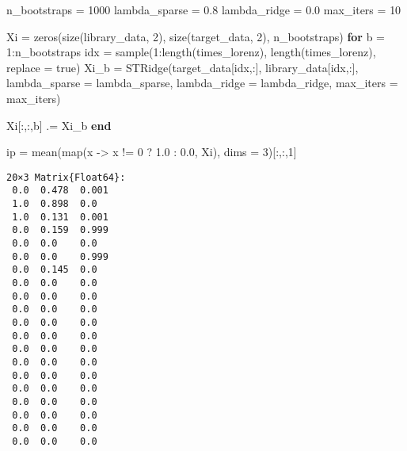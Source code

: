 \documentclass[
]{article}
\newenvironment{Shaded}{\begin{snugshade}}{\end{snugshade}}
\newcommand{\ConstantTok}[1]{\textcolor[rgb]{0.56,0.35,0.01}{#1}}
\newcommand{\ControlFlowTok}[1]{\textcolor[rgb]{0.00,0.23,0.31}{\textbf{#1}}}
\newcommand{\FloatTok}[1]{\textcolor[rgb]{0.68,0.00,0.00}{#1}}
\newcommand{\FunctionTok}[1]{\textcolor[rgb]{0.28,0.35,0.67}{#1}}
\newcommand{\NormalTok}[1]{\textcolor[rgb]{0.00,0.23,0.31}{#1}}
\newcommand{\OperatorTok}[1]{\textcolor[rgb]{0.37,0.37,0.37}{#1}}
\begin{document}
\begin{Shaded}
\begin{Highlighting}[]
\NormalTok{n\_bootstraps }\OperatorTok{=} \FloatTok{1000}
\NormalTok{lambda\_sparse }\OperatorTok{=} \FloatTok{0.8}
\NormalTok{lambda\_ridge }\OperatorTok{=} \FloatTok{0.0}
\NormalTok{max\_iters }\OperatorTok{=} \FloatTok{10}

\NormalTok{Xi }\OperatorTok{=} \FunctionTok{zeros}\NormalTok{(}\FunctionTok{size}\NormalTok{(library\_data, }\FloatTok{2}\NormalTok{), }\FunctionTok{size}\NormalTok{(target\_data, }\FloatTok{2}\NormalTok{), n\_bootstraps)}
\ControlFlowTok{for}\NormalTok{ b }\OperatorTok{=} \FloatTok{1}\OperatorTok{:}\NormalTok{n\_bootstraps}
\NormalTok{    idx }\OperatorTok{=} \FunctionTok{sample}\NormalTok{(}\FloatTok{1}\OperatorTok{:}\FunctionTok{length}\NormalTok{(times\_lorenz), }\FunctionTok{length}\NormalTok{(times\_lorenz), replace }\OperatorTok{=} \ConstantTok{true}\NormalTok{)}
\NormalTok{    Xi\_b }\OperatorTok{=} \FunctionTok{STRidge}\NormalTok{(target\_data[idx,}\OperatorTok{:}\NormalTok{], library\_data[idx,}\OperatorTok{:}\NormalTok{], }
\NormalTok{        lambda\_sparse }\OperatorTok{=}\NormalTok{ lambda\_sparse,}
\NormalTok{        lambda\_ridge }\OperatorTok{=}\NormalTok{ lambda\_ridge,}
\NormalTok{        max\_iters }\OperatorTok{=}\NormalTok{ max\_iters)}

\NormalTok{    Xi[}\OperatorTok{:}\NormalTok{,}\OperatorTok{:}\NormalTok{,b] }\OperatorTok{.=}\NormalTok{ Xi\_b}
\ControlFlowTok{end}

\NormalTok{ip }\OperatorTok{=} \FunctionTok{mean}\NormalTok{(}\FunctionTok{map}\NormalTok{(x }\OperatorTok{{-}\textgreater{}}\NormalTok{ x }\OperatorTok{!=} \FloatTok{0}\NormalTok{ ? }\FloatTok{1.0} \OperatorTok{:} \FloatTok{0.0}\NormalTok{, Xi), dims }\OperatorTok{=} \FloatTok{3}\NormalTok{)[}\OperatorTok{:}\NormalTok{,}\OperatorTok{:}\NormalTok{,}\FloatTok{1}\NormalTok{]}
\end{Highlighting}
\end{Shaded}

\begin{verbatim}
20×3 Matrix{Float64}:
 0.0  0.478  0.001
 1.0  0.898  0.0
 1.0  0.131  0.001
 0.0  0.159  0.999
 0.0  0.0    0.0
 0.0  0.0    0.999
 0.0  0.145  0.0
 0.0  0.0    0.0
 0.0  0.0    0.0
 0.0  0.0    0.0
 0.0  0.0    0.0
 0.0  0.0    0.0
 0.0  0.0    0.0
 0.0  0.0    0.0
 0.0  0.0    0.0
 0.0  0.0    0.0
 0.0  0.0    0.0
 0.0  0.0    0.0
 0.0  0.0    0.0
 0.0  0.0    0.0
\end{verbatim}
\end{document}
